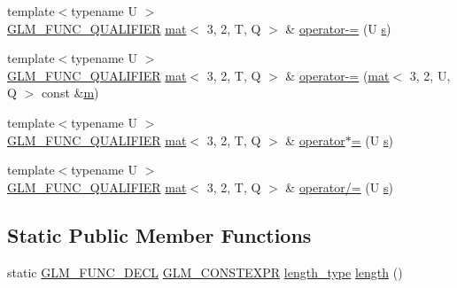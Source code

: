 \begin{DoxyCompactItemize}
{\footnotesize template$<$typename U $>$ }\\\hyperlink{setup_8hpp_a33fdea6f91c5f834105f7415e2a64407}{G\+L\+M\+\_\+\+F\+U\+N\+C\+\_\+\+Q\+U\+A\+L\+I\+F\+I\+ER} \hyperlink{structglm_1_1mat}{mat}$<$ 3, 2, T, Q $>$ \& \hyperlink{structglm_1_1mat_3_013_00_012_00_01_t_00_01_q_01_4_a51cfb6b2048caf1fd49086f4f4d9ddb1}{operator-\/=} (U \hyperlink{_s_d_l__opengl_8h_a4af680a6c683f88ed67b76f207f2e6e4}{s})
\item 
{\footnotesize template$<$typename U $>$ }\\\hyperlink{setup_8hpp_a33fdea6f91c5f834105f7415e2a64407}{G\+L\+M\+\_\+\+F\+U\+N\+C\+\_\+\+Q\+U\+A\+L\+I\+F\+I\+ER} \hyperlink{structglm_1_1mat}{mat}$<$ 3, 2, T, Q $>$ \& \hyperlink{structglm_1_1mat_3_013_00_012_00_01_t_00_01_q_01_4_a2145949a0575fb0b25217ea8d251da3c}{operator-\/=} (\hyperlink{structglm_1_1mat}{mat}$<$ 3, 2, U, Q $>$ const \&\hyperlink{_s_d_l__opengl__glext_8h_af593500c283bf1a787a6f947f503a5c2}{m})
\item 
{\footnotesize template$<$typename U $>$ }\\\hyperlink{setup_8hpp_a33fdea6f91c5f834105f7415e2a64407}{G\+L\+M\+\_\+\+F\+U\+N\+C\+\_\+\+Q\+U\+A\+L\+I\+F\+I\+ER} \hyperlink{structglm_1_1mat}{mat}$<$ 3, 2, T, Q $>$ \& \hyperlink{structglm_1_1mat_3_013_00_012_00_01_t_00_01_q_01_4_af9e97ef690502d8ee8bf7f6d7ec91c9c}{operator$\ast$=} (U \hyperlink{_s_d_l__opengl_8h_a4af680a6c683f88ed67b76f207f2e6e4}{s})
\item 
{\footnotesize template$<$typename U $>$ }\\\hyperlink{setup_8hpp_a33fdea6f91c5f834105f7415e2a64407}{G\+L\+M\+\_\+\+F\+U\+N\+C\+\_\+\+Q\+U\+A\+L\+I\+F\+I\+ER} \hyperlink{structglm_1_1mat}{mat}$<$ 3, 2, T, Q $>$ \& \hyperlink{structglm_1_1mat_3_013_00_012_00_01_t_00_01_q_01_4_a153c18b6262094cf8741f0e82173b2a4}{operator/=} (U \hyperlink{_s_d_l__opengl_8h_a4af680a6c683f88ed67b76f207f2e6e4}{s})
\end{DoxyCompactItemize}
\subsection*{Static Public Member Functions}
\begin{DoxyCompactItemize}
\item 
static \hyperlink{setup_8hpp_ab2d052de21a70539923e9bcbf6e83a51}{G\+L\+M\+\_\+\+F\+U\+N\+C\+\_\+\+D\+E\+CL} \hyperlink{setup_8hpp_a08b807947b47031d3a511f03f89645ad}{G\+L\+M\+\_\+\+C\+O\+N\+S\+T\+E\+X\+PR} \hyperlink{structglm_1_1mat_3_013_00_012_00_01_t_00_01_q_01_4_ac2f268fa5e899b2a6ad8139183ed61d4}{length\+\_\+type} \hyperlink{structglm_1_1mat_3_013_00_012_00_01_t_00_01_q_01_4_a0749f456a66fa818e3d8aa4db3eaea3b}{length} ()
\end{DoxyCompactItemize}
